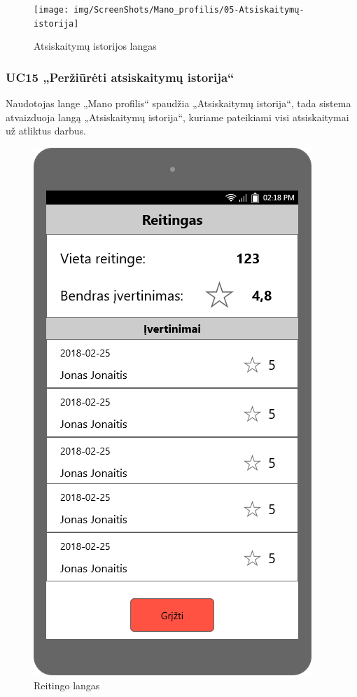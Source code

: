 \documentclass{VUMIFPSbakalaurinis}
\begin{document}
\begin{figure}[H]
	\centering
	\texttt{[image: img/ScreenShots/Mano\_profilis/05-Atsiskaitymų-istorija]}
	\caption{Atsiskaitymų istorijos langas}
	\label{img:payment history}
\end{figure}
\subsubsection{UC15 „Peržiūrėti atsiskaitymų istorija“}
Naudotojas lange „Mano profilis“ spaudžia „Atsiskaitymų istorija“, tada sistema atvaizduoja langą „Atsiskaitymų istorija“, kuriame pateikiami visi atsiskaitymai už atliktus darbus.

\begin{figure}[H]
	\centering
	\includegraphics[scale=0.4]{img/ScreenShots/Mano_profilis/06-Reitingas}
	\caption{Reitingo langas}
	\label{img:rating}
\end{figure}
\end{document}
